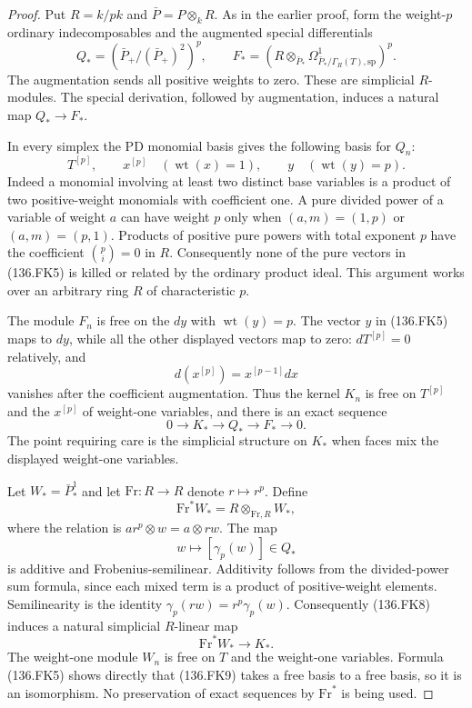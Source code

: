 \begin{proof}
Put $R=k/pk$ and $\bar P=P\otimes_kR$. As in the earlier
proof, form the weight-$p$ ordinary indecomposables and the
augmented special differentials
\[
 Q_*=(\bar P_+/(\bar P_+)^2)^p,\qquad
 F_*=\left(R\otimes_{\bar P_*}
          \Omega^1_{\bar P_*/\Gamma_R(T),\mathrm{sp}}\right)^p.
                                                               \tag{136.FK4}
\]
The augmentation sends all positive weights to zero.
These are simplicial $R$-modules. The special derivation,
followed by augmentation, induces a natural map $Q_*\to F_*$.

In every simplex the PD monomial basis gives the following
basis for $Q_n$:
\[
 T^{[p]},\qquad x^{[p]}\quad(\operatorname{wt}(x)=1),
       \qquad y\quad(\operatorname{wt}(y)=p).               \tag{136.FK5}
\]
Indeed a monomial involving at least two distinct base
variables is a product of two positive-weight monomials
with coefficient one. A pure divided power of a variable
of weight $a$ can have weight $p$ only when $(a,m)=(1,p)$
or $(a,m)=(p,1)$. Products of positive pure powers with total
exponent $p$ have the coefficient $\binom pi=0$ in $R$.
Consequently none of the pure vectors in (136.FK5) is killed
or related by the ordinary product ideal. This argument
works over an arbitrary ring $R$ of characteristic $p$.

The module $F_n$ is free on the $dy$ with
$\operatorname{wt}(y)=p$. The vector $y$ in (136.FK5) maps
to $dy$, while all the other displayed vectors map to zero:
$dT^{[p]}=0$ relatively, and
\[
                  d(x^{[p]})=x^{[p-1]}dx
\]
vanishes after the coefficient augmentation. Thus the kernel
$K_n$ is free on $T^{[p]}$ and the $x^{[p]}$ of weight-one
variables, and there is an exact sequence
\[
                  0\longrightarrow K_*
                      \longrightarrow Q_*
                      \longrightarrow F_*
                      \longrightarrow0.                  \tag{136.FK6}
\]
The point requiring care is the simplicial structure on
$K_*$ when faces mix the displayed weight-one variables.

Let $W_*=\bar P_*^1$ and let
$\mathrm{Fr}:R\to R$ denote $r\mapsto r^p$. Define
\[
              \mathrm{Fr}^*W_*=R\otimes_{\mathrm{Fr},R}W_*,
                                                               \tag{136.FK7}
\]
where the relation is
$a r^p\otimes w=a\otimes rw$.
The map
\[
                  w\longmapsto[\gamma_p(w)]\in Q_*
                                                               \tag{136.FK8}
\]
is additive and Frobenius-semilinear. Additivity follows
from the divided-power sum formula, since each mixed term
is a product of positive-weight elements. Semilinearity is
the identity $\gamma_p(rw)=r^p\gamma_p(w)$.
Consequently (136.FK8) induces a natural simplicial
$R$-linear map
\[
                    \mathrm{Fr}^*W_*\longrightarrow K_*.
                                                               \tag{136.FK9}
\]
The weight-one module $W_n$ is free on $T$ and the
weight-one variables. Formula (136.FK5) shows directly
that (136.FK9) takes a free basis to a free basis, so it is
an isomorphism. No preservation of exact sequences by
$\mathrm{Fr}^*$ is being used.


\end{proof}
